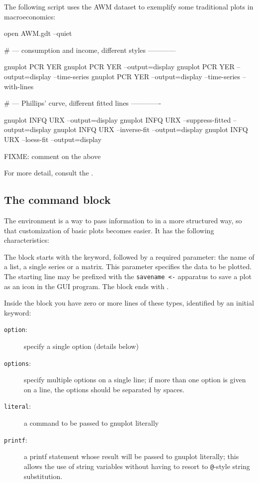 The following script uses the AWM dataset to exemplify some
traditional plots in macroeconomics:

\begin{scode}
open AWM.gdt --quiet

# --- consumption and income, different styles ------------

gnuplot PCR YER
gnuplot PCR YER --output=display
gnuplot PCR YER --output=display --time-series
gnuplot PCR YER --output=display --time-series --with-lines

# --- Phillips' curve, different fitted lines -------------

gnuplot INFQ URX --output=display
gnuplot INFQ URX --suppress-fitted --output=display
gnuplot INFQ URX --inverse-fit --output=display
gnuplot INFQ URX --loess-fit --output=display
\end{scode}

FIXME: comment on the above

For more detail, consult the \GCR.


\subsection{The  command block}
\label{sec:plotblock}

The  environment is a way to pass information to
 in a more structured way, so that customization of basic
plots becomes easier. It has the following characteristics:

The block starts with the  keyword, followed by a required
parameter: the name of a list, a single series or a matrix. This
parameter specifies the data to be plotted. The starting line may be
prefixed with the \verb|savename <-| apparatus to save a plot as an icon
in the GUI program. The block ends with .

Inside the block you have zero or more lines of these types, identified 
by an initial keyword:
\begin{description}
\item[\normalfont \texttt{option}:] specify a single option (details below)
\item[\normalfont \texttt{options}:] specify multiple options on a single line; if
  more than one option is given on a line, the options should be
  separated by spaces.
\item[\normalfont \texttt{literal}:] a command to be passed to gnuplot literally 
\item[\normalfont \texttt{printf}:] a printf statement whose result will be passed
  to gnuplot literally; this allows the use of string variables
  without having to resort to \verb!@!-style string substitution.
\end{description}

